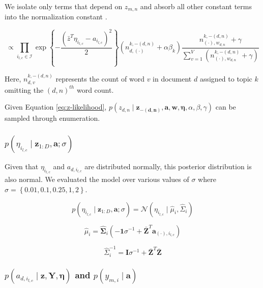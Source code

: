 \documentclass{article}
\begin{document}
We isolate only terms that depend on $z_{m,n}$ and absorb all other
constant terms into the normalization constant \citep{Griffiths04}.

\begin{equation}
\propto\prod_{i_{l,c}\in\mathcal{I}}\exp\left\{ -\frac{\left(\bar{z}^{T}\eta_{i_{l,c}}-a_{i_{l,c}}\right)^{2}}{2}\right\} \left(n_{d,\left(\cdot\right)}^{k,-\left(d,n\right)}+\alpha\beta_{k}\right)\frac{n_{\left(\cdot\right),w_{d,n}}^{k,-\left(d,n\right)}+\gamma}{\sum_{v=1}^{V}\left(n_{\left(\cdot\right),w_{d,n}}^{k,-\left(d,n\right)}+\gamma\right)}\label{eq:z-likelihood}\end{equation}


Here, $n_{d,v}^{k,-\left(d,n\right)}$ represents the count of word
$v$ in document $d$ assigned to topic $k$ omitting the $(d,n)^{th}$
word count.

Given Equation \ref{eq:z-likelihood}, $p\left(z_{d,n}\mid\mathbf{z_{-\left(d,n\right)}},\mathbf{a},\mathbf{w},\mathbf{\eta},\alpha,\beta,\gamma\right)$
can be sampled through enumeration.


\subsubsection{$p\left(\eta_{i_{l,c}}\mid\mathbf{z}_{1:D},\mathbf{a};\sigma\right)$}

Given that $\eta_{i_{l,c}}$ and $a_{d,i_{l,c}}$ are distributed
normally, this posterior distribution is also normal. We evaluated
the model over various values of $\sigma$ where $\sigma=\left\{ 0.01,0.1,0.25,1,2\right\} $.

\begin{equation}
p\left(\eta_{i_{l,c}}\mid\mathbf{z}_{1:D},\mathbf{a};\sigma\right)=\mathcal{N}\left(\eta_{i_{l,c}}\mid\hat{\mu}_{i},\hat{\Sigma}_{i}\right)\end{equation}


\[
\hat{\mu}_{i}=\hat{\mathbf{\Sigma}}_{i}\left(-\mathbf{1}\sigma^{-1}+\bar{\mathbf{Z}}^{T}\mathbf{a}_{\left(\cdot\right),i_{l,c}}\right)\]


\[
\hat{\Sigma}_{i}^{-1}=\mathbf{I}\sigma^{-1}+\bar{\mathbf{Z}}^{T}\bar{\mathbf{Z}}\]



\subsubsection{$p\left(a_{d,i_{l,c}}\mid\mathbf{z},\mathbf{Y},\mathbf{\eta}\right)$
and \textmd{$p\left(y_{m,i}\mid\mathbf{a}\right)$}}
\end{document}
